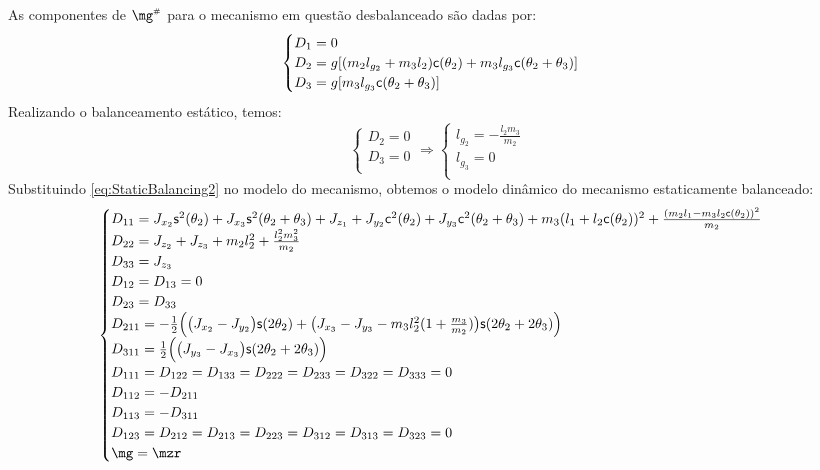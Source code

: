 \documentclass[a4paper,11pt,brazil,fleqn]{article}
\begin{document}
As componentes de $\mg\ssh$ para o mecanismo em quest\~{a}o desbalanceado s\~{a}o dadas por:
\begin{equation}
\begin{cases}\label{eq:gh2}
D_1 = 0 \\
D_2 = g[ (m_2 l_{g_2} + m_3 l_2  ) \mathsf{c}(\theta_2) + m_3 l_{g_3} \mathsf{c}(\theta_2 + \theta_3) ]  \\
D_3 = g[ m_3 l_{g_3} \mathsf{c}(\theta_2 + \theta_3)  ] \\
\end{cases}
\end{equation} 
Realizando o balanceamento est\'{a}tico, temos:
\begin{equation}\label{eq:StaticBalancing2}
\begin{cases}
D_2 = 0 \\
D_3 = 0 \\
\end{cases}
\Rightarrow
\begin{cases}
l_{g_2} = -\frac{l_2 m_3}{m_2} \\
l_{g_3} = 0 \\
\end{cases}
\end{equation}
Substituindo \eqref{eq:StaticBalancing2} no modelo do mecanismo, obtemos o modelo din\^{a}mico do mecanismo estaticamente balanceado:
\begin{equation}\label{eq:StaticBalanced2}
\begin{cases}
D_{11} = J_{x_2}\ssin^2(\theta_2) + J_{x_3}\ssin^2(\theta_2+\theta_3) + J_{z_1} + J_{y_2}\ccos^2(\theta_2) + J_{y_3}\ccos^2(\theta_2+\theta_3) + m_3 (l_1 + l_2 \ccos(\theta_2))^2 + \frac{(m_2 l_1 - m_3 l_2 \ccos(\theta_2))^2}{m_2} \\
D_{22} = J_{z_2} + J_{z_3} + m_2 l_2^2 + \frac{l_2^2 m_3^2}{m_2} \\
D_{33} = J_{z_3} \\
D_{12} = D_{13} = 0 \\
D_{23} = D_{33} \\
D_{211} = -\frac{1}{2} \Big( \big( J_{x_2} - J_{y_2} \big) \ssin(2\theta_2) + \big(J_{x_3} - J_{y_3} - m_3 l_2^2 ( 1 + \frac{m_3}{m_2} )\big)\ssin(2\theta_2+2\theta_3)    \Big) \\
D_{311} = \frac{1}{2} \Big( \big(J_{y_3} - J_{x_3} \big)\ssin(2\theta_2+2\theta_3) \Big) \\
D_{111} = D_{122} = D_{133} = D_{222} = D_{233} = D_{322} = D_{333} = 0 \\
D_{112} = - D_{211} \\
D_{113} = - D_{311} \\
D_{123} = D_{212} = D_{213} = D_{223} = D_{312} = D_{313} = D_{323} = 0 \\
\mg = \mzr
\end{cases}
\end{equation}
\end{document}
